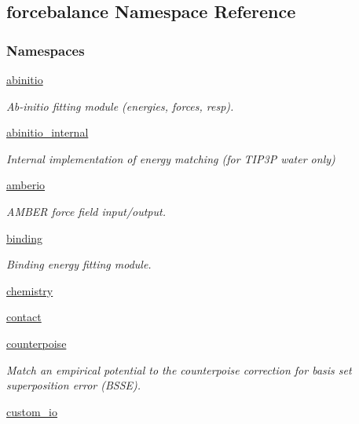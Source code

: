\hypertarget{namespaceforcebalance}{\subsection{forcebalance Namespace Reference}
\label{namespaceforcebalance}
}
\subsubsection*{Namespaces}
\begin{DoxyCompactItemize}
\item 
\hyperlink{namespaceforcebalance_1_1abinitio}{abinitio}
\begin{DoxyCompactList}\small\item\em Ab-\/initio fitting module (energies, forces, resp). \end{DoxyCompactList}\item 
\hyperlink{namespaceforcebalance_1_1abinitio__internal}{abinitio\-\_\-internal}
\begin{DoxyCompactList}\small\item\em Internal implementation of energy matching (for T\-I\-P3\-P water only) \end{DoxyCompactList}\item 
\hyperlink{namespaceforcebalance_1_1amberio}{amberio}
\begin{DoxyCompactList}\small\item\em A\-M\-B\-E\-R force field input/output. \end{DoxyCompactList}\item 
\hyperlink{namespaceforcebalance_1_1binding}{binding}
\begin{DoxyCompactList}\small\item\em Binding energy fitting module. \end{DoxyCompactList}\item 
\hyperlink{namespaceforcebalance_1_1chemistry}{chemistry}
\item 
\hyperlink{namespaceforcebalance_1_1contact}{contact}
\item 
\hyperlink{namespaceforcebalance_1_1counterpoise}{counterpoise}
\begin{DoxyCompactList}\small\item\em Match an empirical potential to the counterpoise correction for basis set superposition error (B\-S\-S\-E). \end{DoxyCompactList}\item 
\hyperlink{namespaceforcebalance_1_1custom__io}{custom\-\_\-io}

\end{DoxyCompactItemize}
